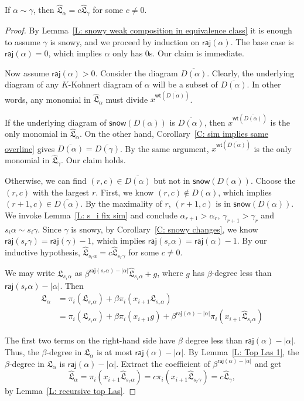 \documentclass[10pt]{amsart}
\theoremstyle{plain}
\theoremstyle{plain}
\theoremstyle{definition}
\theoremstyle{definition}
\theoremstyle{definition}
\theoremstyle{plain}
\theoremstyle{plain}
\theoremstyle{plain}
\theoremstyle{plain}
\theoremstyle{plain}
\theoremstyle{remark}
\theoremstyle{remark}
\theoremstyle{plain}
\theoremstyle{plain}
\newenvironment{manuallemma}[1]{
  \renewcommand\themanuallemmainner{#1}
  \manuallemmainner
}{\endmanuallemmainner}
\newcommand{\fL}{\mathfrak{L}}
\newcommand{\fLb}{\fL}
\newcommand{\topLas}{\widehat{\fL}}
\newcommand{\wt}{\mathsf{wt}}
\newcommand{\snow}{\mathsf{snow}}
\newcommand{\raj}{\mathsf{raj}}
\begin{document}
\begin{manuallemma}{\ref{L: Top Las similar}}
If $\alpha \sim \gamma$, 
then $\topLas_\alpha = c\topLas_\gamma$ for some $c \neq 0$.
\end{manuallemma}
\begin{proof}
By Lemma~\ref{L: snowy weak composition in equivalence class} 
it is enough to assume $\gamma$ is snowy, and we proceed by induction on $\raj(\alpha)$.
The base case is $\raj(\alpha) = 0$,
which implies $\alpha$ only has 0s. 
Our claim is immediate. 

Now assume $\raj(\alpha) > 0$.
Consider the diagram $\overline{D(\alpha)}$.
Clearly, the underlying diagram of any $K$-Kohnert diagram
of $\alpha$ will be a subset of $\overline{D(\alpha)}$.
In other words, any monomial in $\topLas_{\alpha}$
must divide $x^{\wt(\overline{D(\alpha)})}$.

If the underlying diagram of $\snow(D(\alpha))$
is $\overline{D(\alpha)}$, 
then $x^{\wt(\overline{D(\alpha)})}$ is the only monomial
in $\topLas_{\alpha}$.
On the other hand, 
Corollary~\ref{C: sim implies same overline} gives
$\overline{D(\alpha)} = \overline{D(\gamma)}$.
By the same argument, $x^{\wt(\overline{D(\alpha)})}$ is the only monomial
in $\topLas_{\gamma}$.
Our claim holds. 

Otherwise, we can find $(r,c) \in \overline{D(\alpha)}$
but not in $\snow(D(\alpha))$.
Choose the $(r,c)$ with the largest $r$.
First, we know $(r,c) \notin D(\alpha)$,
which implies $(r+1, c) \in \overline{D(\alpha)}$.
By the maximality of $r$,
$(r+1, c)$ is in $\snow(D(\alpha))$.
We invoke Lemma~\ref{L: s_i fix sim}
and conclude $\alpha_{r+1} > \alpha_{r}$,
$\gamma_{r+1} > \gamma_{r}$
and $s_i \alpha \sim s_i \gamma$.
Since $\gamma$ is snowy,
by Corollary~\ref{C: snowy changes},
we know $\raj(s_r \gamma) = \raj(\gamma) - 1$,
which implies $\raj(s_r \alpha) = \raj(\alpha) - 1$.
By our inductive hypothesis, 
$\topLas_{s_r \alpha} = c \topLas_{s_r \gamma}$
for some $c \neq 0$.

We may write 
$\fLb_{s_r \alpha}$ 
as $\beta^{\raj(s_r \alpha) - |\alpha|}\topLas_{s_r \alpha} + g$,
where $g$ has $\beta$-degree less than  
$\raj(s_r \alpha) - |\alpha|$.
Then 
\begin{align*}
\fLb_\alpha 
& = \pi_i(\fLb_{s_r \alpha}) + \beta \pi_i(x_{i+1}\fLb_{s_r \alpha})\\
& = \pi_i(\fLb_{s_r \alpha}) + \beta \pi_i(x_{i+1} g) + \beta^{\raj(\alpha) - |\alpha|} \pi_i(x_{i+1} \topLas_{s_r \alpha})    
\end{align*}

The first two terms on the right-hand side have $\beta$ degree 
less than $\raj(\alpha) - |\alpha|$.
Thus, the $\beta$-degree in $\fLb_\alpha$ is at most $\raj(\alpha) - |\alpha|$.
By Lemma~\ref{L: Top Las 1},
the $\beta$-degree in $\fLb_\alpha$ is $\raj(\alpha) - |\alpha|$.
Extract the coefficient of $\beta^{\raj(\alpha) - |\alpha|}$ and get
$$
\topLas_\alpha = \pi_i(x_{i+1} \topLas_{s_r \alpha}) = c\pi_i(x_{i+1} \topLas_{s_r \gamma}) = c\topLas_{\gamma},
$$
by Lemma~\ref{L: recursive top Las}.
\end{proof}
\end{document}
